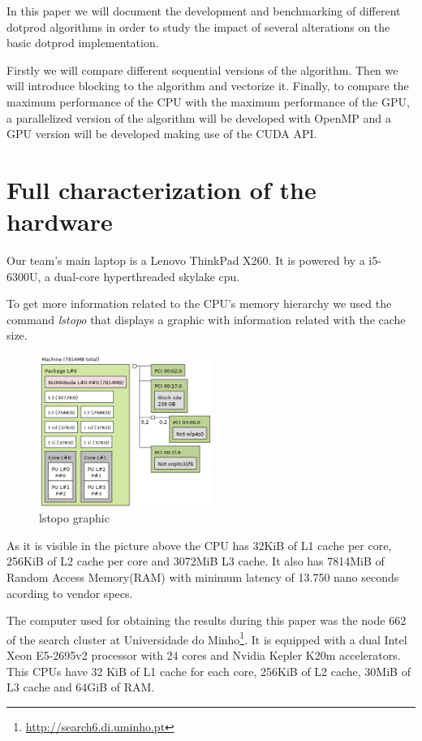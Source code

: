 \documentclass[a4paper]{report}
\begin{document}
In this paper we will document the development and benchmarking of different
dotprod algorithms in order to study the impact of several alterations on the
basic dotprod implementation.

Firstly we will compare different sequential versions of the algorithm. Then we
will introduce blocking to the algorithm and vectorize it. Finally, to compare
the maximum performance of the CPU with the maximum performance of the GPU, a
parallelized version of the algorithm will be developed with OpenMP and a GPU
version will be developed making use of the CUDA API.

\chapter{Full characterization of the hardware}
Our team's main laptop is a Lenovo ThinkPad X260. It is powered by a i5-6300U, a
dual-core hyperthreaded skylake cpu.

To get more information related to the CPU's memory hierarchy we used the
command \textit{lstopo} that displays a graphic with information related with
the cache size.
\begin{figure}[H]
    \centering
        \includegraphics[width=0.5\textwidth]{images/lstopo.png}
        \caption{lstopo graphic}
\end{figure}

As it is visible in the picture above the CPU has 32KiB of L1 cache per core,
256KiB of L2 cache per core and 3072MiB L3 cache. It also has 7814MiB of Random
Access Memory(RAM) with minimum latency of 13.750 nano seconds acording to
vendor specs.

The computer used for obtaining the results during this paper was the node 662
of the search cluster at Universidade do
Minho\footnote[1]{\url{http://search6.di.uminho.pt}}. It is equipped with
a
dual Intel Xeon E5-2695v2 processor
with 24 cores and Nvidia Kepler K20m accelerators. This CPUs have 32 KiB of L1
cache for each core, 256KiB of L2 cache, 30MiB of L3 cache and 64GiB of RAM.
\end{document}
